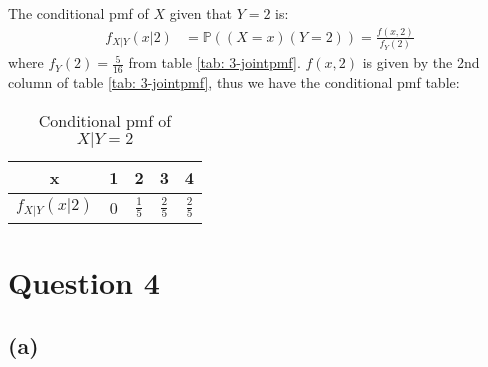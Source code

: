 \documentclass[12pt]{article}
\begin{document}
The conditional pmf of $X$ given that $Y = 2$ is: \begin{align*}
    f_{X|Y}(x | 2) &= \mathbb{P}((X = x)(Y = 2)) = \frac{f(x,2)}{f_Y(2)} 
\end{align*} where $f_Y(2) = \frac{5}{16}$ from table \ref{tab: 3-jointpmf}. $f(x,2)$ is given by the 2nd column of table \ref{tab: 3-jointpmf}, thus we have the conditional pmf table: 

\begin{table}[H]
    \centering
    \def\arraystretch{1.3}
    \begin{tabular}{| c | c | c | c | c |}
        \hline x & 1 & 2 & 3 & 4 \\ \hline 
        $f_{X|Y} (x | 2)$ & 0 & $\frac{1}{5}$ & $\frac{2}{5}$ & $\frac{2}{5}$ \\ \hline 
    \end{tabular}
    \caption{Conditional pmf of $X | Y = 2$}
    \label{tab: 3-conditionalpmf}
\end{table}

\newpage

\section*{Question 4}

\subsection*{(a)}
\end{document}
